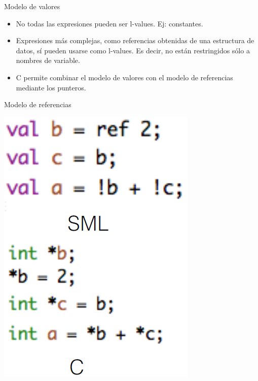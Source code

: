 \documentclass[handout]{beamer} %
\begin{document}
\begin{frame}{Modelo de valores}
\begin{minipage}{0.65\textwidth}
\begin{itemize}
     \end{itemize}
    \end{minipage}
    \pause
    \begin{itemize}
        \item No todas las expresiones pueden ser l-values. Ej: constantes.
        \item Expresiones más complejas, como referencias obtenidas de una estructura de datos, sí pueden usarse como l-values. Es decir, no están restringidos sólo a nombres de variable.
        \item C permite combinar el modelo de valores con el modelo de referencias mediante los punteros.
    \end{itemize}
\end{frame}

\begin{frame}{Modelo de referencias}
    \begin{minipage}{0.3\textwidth}
    \includegraphics[width=\textwidth]{./image/cap6/valores-SML-C}

\end{minipage}
\end{frame}
\end{document}
